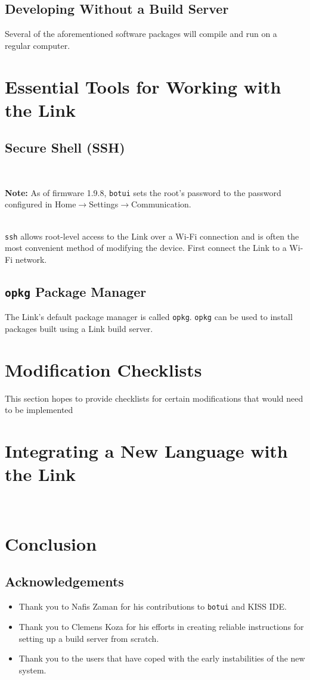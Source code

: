 \documentclass[12pt,letterpaper]{article}
\newcommand{\bcolorbox}[4]{\noindent \\ \fcolorbox{#1}{#2} {\parbox{\textwidth}{\vspace{.1em}\textbf{#3} #4\vspace{.1em}}} \\}
\newcommand{\note}[1]{\bcolorbox{yellow}{Seashell}{Note:}{#1}}
\begin{document}
	\subsection{Developing Without a Build Server}
	Several of the aforementioned software packages will compile and run on a regular computer.
	
	\section{Essential Tools for Working with the Link}
	
	\subsection{Secure Shell (SSH)}
	\note{As of firmware 1.9.8, \texttt{botui} sets the root's password to the password configured in
	Home$\rightarrow$Settings$\rightarrow$Communication.}
	
	\texttt{ssh} allows root-level access to the Link over a Wi-Fi connection and is often the most convenient method of
	modifying the device. First connect the Link to a Wi-Fi network.
	
	\subsection{\texttt{opkg} Package Manager}
	The Link's default package manager is called \texttt{opkg}. \texttt{opkg} can be used to install packages built using
	a Link build server.
	
	\section{Modification Checklists}
	This section hopes to provide checklists for certain modifications that would need to be implemented
	
	
	\section{Integrating a New Language with the Link}
	
	\
	
	\section{Conclusion}
	
	
	
	\subsection{Acknowledgements}
	\begin{itemize}
		\setlength{\itemsep}{0em}
		\item Thank you to Nafis Zaman for his contributions to \texttt{botui} and KISS IDE.
		\item Thank you to Clemens Koza for his efforts in creating reliable instructions for setting up a build server from scratch.
		\item Thank you to the users that have coped with the early instabilities of the new system.
	\end{itemize}
\end{document}
